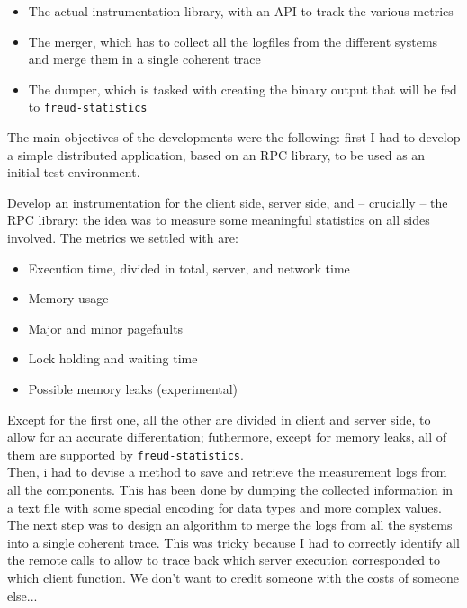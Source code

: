         \begin{itemize}
            \item The actual instrumentation library, with an API to track the various metrics
            \item The merger, which has to collect all the logfiles from the different systems
             and merge them in a single coherent trace
            \item The dumper, which is tasked with creating the binary output that will be fed
             to \texttt{freud-statistics}
        \end{itemize}

        The main objectives of the developments were the following: first I had to develop a
        simple distributed application, based on an RPC library, to be used as an initial test environment.

        Develop an instrumentation for the client side, server side, and – crucially – the RPC library:
        the idea was to measure some meaningful statistics on all sides involved. The metrics we settled with are:

        \begin{itemize}
            \item Execution time, divided in total, server, and network time
            \item Memory usage
            \item Major and minor pagefaults
            \item Lock holding and waiting time
            \item Possible memory leaks (experimental)
        \end{itemize}

        Except for the first one, all the other are divided in client and server side, to allow for an
        accurate differentation; futhermore, except for memory leaks, all of them are supported by 
        \texttt{freud-statistics}.\\

        Then, i had to devise a method to save and retrieve the measurement logs from all the components.
        This has been done by dumping the collected information in a text file with some special encoding
        for data types and more complex values.\\

        The next step was to design an algorithm to merge the logs from all the systems into a single
        coherent trace. This was tricky because I had to correctly identify all the remote calls to allow
        to trace back which server execution corresponded to which client function. We don't want to credit
        someone with the costs of someone else...\\

